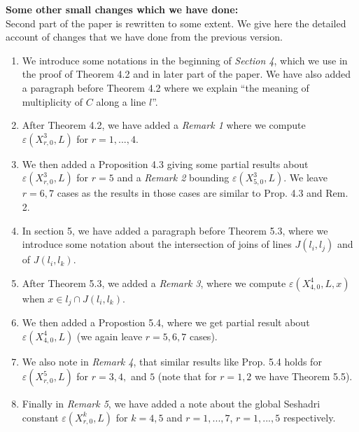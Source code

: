 \documentclass[12pt,twoside,reqno]{amsart}
\numberwithin{equation}{section}
\theoremstyle{definition}
\begin{document}
\textbf{Some other small changes which we have done:} \\
Second part of the paper is rewritten to some extent. We give here the detailed account of changes that we have done from the previous version.
\begin{enumerate}
    \item We introduce some notations in the beginning of \textit{Section 4}, which we use in the proof of Theorem 4.2 and in later part of the paper. We have also added a paragraph before Theorem 4.2 where we explain ``the meaning of multiplicity of $C$ along a line $l$''. 
    \item After Theorem 4.2, we have added a \textit{Remark 1} where we compute $\varepsilon(X_{r,0}^3,L)$ for $r=1,...,4$.
    \item We then added a Proposition 4.3 giving some partial results about $\varepsilon(X_{r,0}^3,L)$ for $r=5$ and 
    a \textit{Remark 2} bounding $\varepsilon(X_{5,0}^3,L)$. We leave $r=6,7$ cases as the results in those cases are similar to Prop. 4.3 and Rem. 2.
    \item In section 5, we have added a paragraph before Theorem 5.3, where we introduce some notation about the intersection of joins of lines $J(l_i, l_j)$ and of $J(l_i, l_k)$.
    \item After Theorem 5.3, we added a \textit{Remark 3}, where we compute $\varepsilon(X_{4,0}^4,L,x)$ when $x \in l_j \cap J(l_i,l_k)$.
    \item We then added a Propostion 5.4, where we get partial result about $\varepsilon(X_{4,0}^4,L)$ (we again leave $r=5,6,7$ cases).
    \item We also note in \textit{Remark 4}, that similar results like Prop. 5.4 holds for $\varepsilon(X_{r,0}^5,L)$ 
    for $r=3,4,$ and $5$ (note that for $r=1,2$ we have Theorem 5.5).
    \item Finally in \textit{Remark 5}, we have added a note about the global Seshadri constant $\varepsilon(X_{r,0}^k,L)$ for $k=4,5$ and $r=1,...,7$, $r=1,...,5$ respectively.
\end{enumerate}
\end{document}
